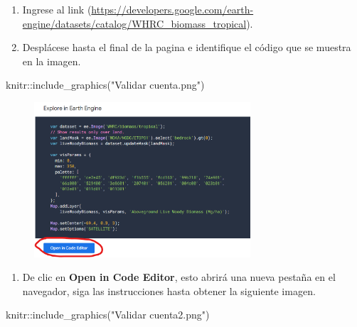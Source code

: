 \documentclass[
  letterpaper,
  DIV=11,
  numbers=noendperiod]{scrartcl}
\newenvironment{Shaded}{\begin{snugshade}}{\end{snugshade}}
\newcommand{\FunctionTok}[1]{\textcolor[rgb]{0.28,0.35,0.67}{#1}}
\newcommand{\NormalTok}[1]{\textcolor[rgb]{0.00,0.23,0.31}{#1}}
\newcommand{\SpecialCharTok}[1]{\textcolor[rgb]{0.37,0.37,0.37}{#1}}
\newcommand{\StringTok}[1]{\textcolor[rgb]{0.13,0.47,0.30}{#1}}
\providecommand{\tightlist}{%
  \setlength{\itemsep}{0pt}\setlength{\parskip}{0pt}}\usepackage{longtable,booktabs,array}
\begin{document}
\begin{enumerate}
\def\labelenumi{\arabic{enumi}.}
\item
  Ingrese al link
  (\url{https://developers.google.com/earth-engine/datasets/catalog/WHRC_biomass_tropical}).
\item
  Desplácese hasta el final de la pagina e identifique el código que se
  muestra en la imagen.
\end{enumerate}

\begin{Shaded}
\begin{Highlighting}[]
\NormalTok{knitr}\SpecialCharTok{::}\FunctionTok{include\_graphics}\NormalTok{(}\StringTok{"Validar cuenta.png"}\NormalTok{)}
\end{Highlighting}
\end{Shaded}

\begin{figure}[H]

{\centering \includegraphics[width=3.17in,height=\textheight]{Validar cuenta.png}

}

\end{figure}

\begin{enumerate}
\def\labelenumi{\arabic{enumi}.}
\setcounter{enumi}{2}
\tightlist
\item
  De clic en \textbf{Open in Code Editor}, esto abrirá una nueva pestaña
  en el navegador, siga las instrucciones hasta obtener la siguiente
  imagen.
\end{enumerate}

\begin{Shaded}
\begin{Highlighting}[]
\NormalTok{knitr}\SpecialCharTok{::}\FunctionTok{include\_graphics}\NormalTok{(}\StringTok{"Validar cuenta2.png"}\NormalTok{)}
\end{Highlighting}
\end{Shaded}
\end{document}
